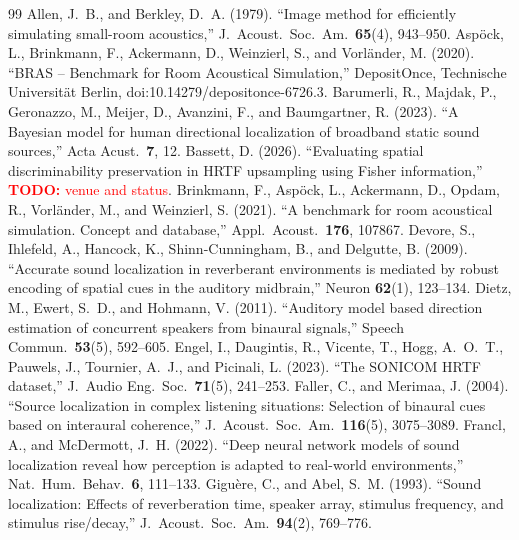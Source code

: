 \documentclass[11pt]{article}
\newcommand{\todo}[1]{\textcolor{red}{\textbf{TODO:} #1}}
\begin{document}
\begin{thebibliography}{99}
 Allen, J.~B., and Berkley, D.~A. (1979). ``Image method for efficiently simulating small-room acoustics,'' J.\ Acoust.\ Soc.\ Am.\ \textbf{65}(4), 943--950.
 Asp\"ock, L., Brinkmann, F., Ackermann, D., Weinzierl, S., and Vorl\"ander, M. (2020). ``BRAS -- Benchmark for Room Acoustical Simulation,'' DepositOnce, Technische Universit\"at Berlin, doi:10.14279/depositonce-6726.3.
 Barumerli, R., Majdak, P., Geronazzo, M., Meijer, D., Avanzini, F., and Baumgartner, R. (2023). ``A Bayesian model for human directional localization of broadband static sound sources,'' Acta Acust.\ \textbf{7}, 12.
 Bassett, D. (2026). ``Evaluating spatial discriminability preservation in HRTF upsampling using Fisher information,'' \todo{venue and status}.
 Brinkmann, F., Asp\"ock, L., Ackermann, D., Opdam, R., Vorl\"ander, M., and Weinzierl, S. (2021). ``A benchmark for room acoustical simulation. Concept and database,'' Appl.\ Acoust.\ \textbf{176}, 107867.
 Devore, S., Ihlefeld, A., Hancock, K., Shinn-Cunningham, B., and Delgutte, B. (2009). ``Accurate sound localization in reverberant environments is mediated by robust encoding of spatial cues in the auditory midbrain,'' Neuron \textbf{62}(1), 123--134.
 Dietz, M., Ewert, S.~D., and Hohmann, V. (2011). ``Auditory model based direction estimation of concurrent speakers from binaural signals,'' Speech Commun.\ \textbf{53}(5), 592--605.
 Engel, I., Daugintis, R., Vicente, T., Hogg, A.~O.~T., Pauwels, J., Tournier, A.~J., and Picinali, L. (2023). ``The SONICOM HRTF dataset,'' J.\ Audio Eng.\ Soc.\ \textbf{71}(5), 241--253.
 Faller, C., and Merimaa, J. (2004). ``Source localization in complex listening situations: Selection of binaural cues based on interaural coherence,'' J.\ Acoust.\ Soc.\ Am.\ \textbf{116}(5), 3075--3089.
 Francl, A., and McDermott, J.~H. (2022). ``Deep neural network models of sound localization reveal how perception is adapted to real-world environments,'' Nat.\ Hum.\ Behav.\ \textbf{6}, 111--133.
 Gigu\`ere, C., and Abel, S.~M. (1993). ``Sound localization: Effects of reverberation time, speaker array, stimulus frequency, and stimulus rise/decay,'' J.\ Acoust.\ Soc.\ Am.\ \textbf{94}(2), 769--776.

\end{thebibliography}
\end{document}
